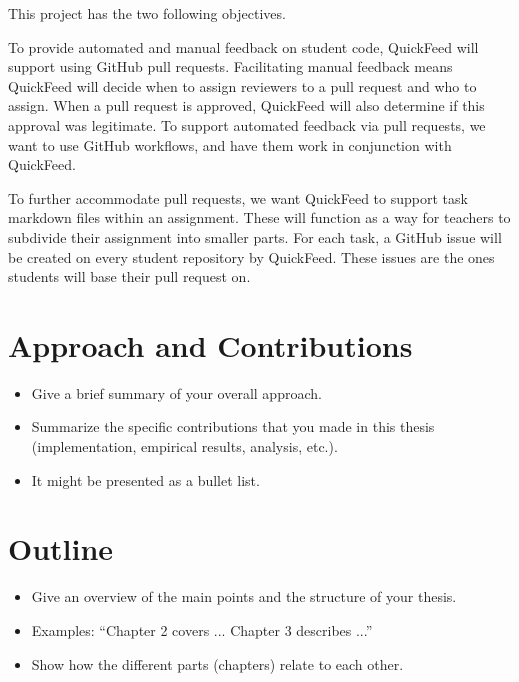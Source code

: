 This project has the two following objectives.

To provide automated and manual feedback on student code, QuickFeed will support using GitHub pull requests.
Facilitating manual feedback means QuickFeed will decide when to assign reviewers to a pull request and who to assign.
When a pull request is approved, QuickFeed will also determine if this approval was legitimate.
To support automated feedback via pull requests, we want to use GitHub workflows, and have them work in conjunction with QuickFeed.

To further accommodate pull requests, we want QuickFeed to support task markdown files within an assignment.
These will function as a way for teachers to subdivide their assignment into smaller parts.
For each task, a GitHub issue will be created on every student repository by QuickFeed.
These issues are the ones students will base their pull request on.

\section{Approach and Contributions}

\begin{itemize}
\item Give a brief summary of your overall approach.
\item Summarize the specific contributions that you made in this thesis (implementation, empirical results, analysis, etc.).
\item It might be presented as a bullet list.
\end{itemize}


\section{Outline}

\begin{itemize}
\item Give an overview of the main points and the structure of your thesis.
\item Examples: ``Chapter 2 covers ...  Chapter 3 describes ...''
\item Show how the different parts (chapters) relate to each other.
\end{itemize}

